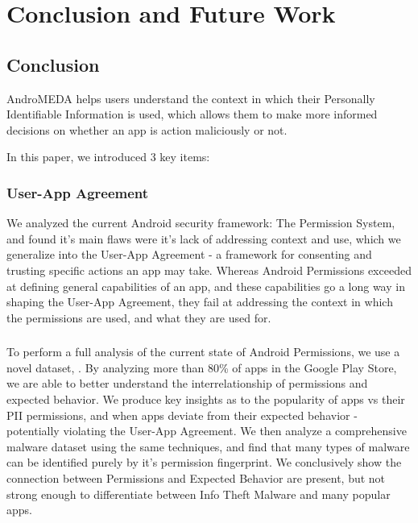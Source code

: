 \chapter{Conclusion and Future Work}
\label{sec:conclusion}
\section{Conclusion}
AndroMEDA helps users understand the context in which their Personally Identifiable Information is used, which allows them to make more informed decisions on whether an app is action maliciously or not. 

In this paper, we introduced 3 key items:
\subsection{User-App Agreement}

We analyzed the current Android security framework: The Permission System, and found it's main flaws were it's lack of addressing context and use, which we generalize into the User-App Agreement - a framework for consenting and trusting specific actions an app may take. Whereas Android Permissions exceeded at defining general capabilities of an app, and these capabilities go a long way in shaping the User-App Agreement, they fail at addressing the context in which the permissions are used, and what they are used for.

\subsection{}
To perform a full analysis of the current state of Android Permissions, we use a novel dataset, . By analyzing more than 80\% of apps in the Google Play Store, we are able to better understand the interrelationship of permissions and expected behavior. We produce key insights as to the popularity of apps vs their PII permissions, and when apps deviate from their expected behavior - potentially violating the User-App Agreement. We then analyze a comprehensive malware dataset using the same techniques, and find that many types of malware can be identified purely by it's permission fingerprint. We conclusively show the connection between Permissions and Expected Behavior are present, but not strong enough to differentiate between Info Theft Malware and many popular apps.

